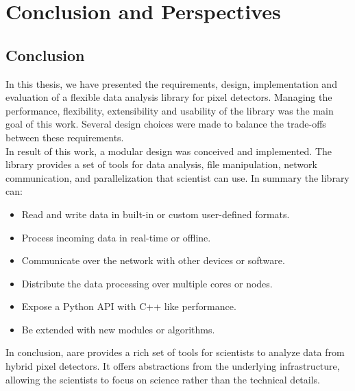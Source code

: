 \chapter{Conclusion and Perspectives}
\pagestyle{fancy}
\fancyhf{}
\fancyhead[R]{\bfseries\rightmark}
\fancyfoot[R]{\thepage}
\renewcommand{\headrulewidth}{0.5pt}
\renewcommand{\footrulewidth}{0pt}
\renewcommand{\chaptermark}[1]{\markboth{\MakeUppercase{\chaptername~\thechapter. #1 }}{}}
\renewcommand{\sectionmark}[1]{\markright{\thechapter.\thesection~ #1}}

\begin{spacing}{1.2}
\section*{Conclusion}
In this thesis, we have presented the requirements, design, implementation and evaluation 
of a flexible data analysis library for pixel detectors. Managing the performance, 
flexibility, extensibility and usability of the library was the main goal of this work.
Several design choices were made to balance the trade-offs between these requirements.\\

In result of this work, a modular design was conceived and implemented. The library 
provides a set of tools for data analysis, file manipulation, network communication,
and parallelization that scientist can use. In summary the library can:

\begin{itemize}
    \item Read and write data in built-in or custom user-defined formats. 
    \item Process incoming data in real-time or offline.
    \item Communicate over the network with other devices or software.
    \item Distribute the data processing over multiple cores or nodes.
    \item Expose a Python API with C++ like performance.
    \item Be extended with new modules or algorithms.
\end{itemize}

In conclusion, aare provides a rich set of tools for scientists to analyze data from
hybrid pixel detectors. It offers abstractions from the underlying infrastructure, 
allowing the scientists to focus on science rather than the technical details.\\



\end{spacing}
